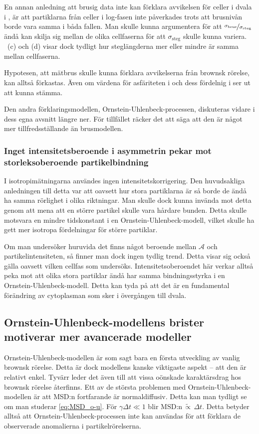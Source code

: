 En annan anledning att brusig data inte kan förklara avvikelsen för celler i dvala i , är att partiklarna från celler i log-fasen inte påverkades trots att brusnivån borde vara samma i båda fallen. Man skulle kunna argumentera för att $\nicefrac{\sigma_\text{brus}}{\sigma_\text{steg}}$ ändå kan skilja sig mellan de olika cellfaserna för att $\sigma_\text{steg}$ skulle kunna variera. ~(c) och (d) visar dock tydligt hur steglängderna mer eller mindre är samma mellan cellfaserna.

Hypotesen, att mätbrus skulle kunna förklara avvikelserna från brownsk rörelse, kan alltså förkastas. Även om värdena för asfäriteten i  och dess fördelnig i  ser ut att kunna stämma. 

Den andra förklaringsmodellen, Ornstein-Uhlenbeck-processen, diskuteras vidare i dess egna avsnitt längre ner. För tillfället räcker det att säga att den är något mer tillfredsställande än brusmodellen. 


\subsubsection{Inget intensitetsberoende i asymmetrin pekar mot storleksoberoende partikelbindning}
I isotropimätningarna användes ingen intensitetskorrigering. Den huvudsakliga anledningen till detta var att oavsett hur stora partiklarna är så borde de ändå ha samma rörlighet i olika riktningar. Man skulle dock kunna invända mot detta genom att mena att en större partikel skulle vara hårdare bunden. Detta skulle motsvara en mindre tidskonstant i en Ornstein-Uhlenbeck-modell, vilket skulle ha gett mer isotropa fördelningar för större partiklar.

Om man undersöker huruvida det finns något beroende mellan $\mathcal{A}$ och partikelintensiteten, så finner man dock ingen tydlig trend. Detta visar sig också gälla oavsett vilken cellfas som undersöks.
Intensitetsoberoendet här verkar alltså peka mot att olika stora partiklar ändå har samma bindningsstyrka i en Ornstein-Uhlenbeck-modell. 
Detta kan tyda på att det är en fundamental förändring av cytoplasman som sker i övergången till dvala.



\subsection{Ornstein-Uhlenbeck-modellens brister motiverar mer avancerade modeller}
Ornstein-Uhlenbeck-modellen är som sagt bara en första utveckling av vanlig brownsk rörelse. Detta är dock modellens kanske viktigaste aspekt -- att den är relativt enkel.
Tyvärr leder det även till att vissa oönskade karaktärsdrag hos brownsk rörelse återfinns. Ett av de största problemen med Ornstein-Uhlenbeck-modellen är att MSD:n fortfarande är normaldiffusiv. Detta kan man tydligt se om man studerar \eqref{eq:MSD_o-u}. För $\gamma\Delta{t}\ll 1$ blir $\text{MSD:n}\,\widetilde{\propto}\,\Delta{t}$.
Detta betyder alltså att Ornstein-Uhlenbeck-processen inte kan användas för att förklara de observerade anomalierna i partikelrörelserna. 

